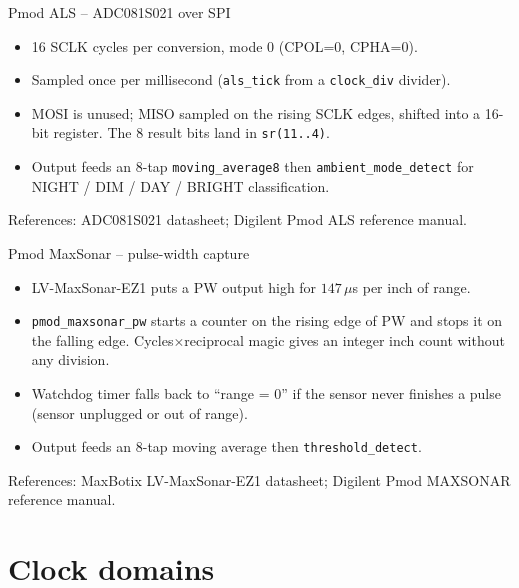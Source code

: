 \documentclass[aspectratio=169,10pt]{beamer}
\begin{document}
\begin{frame}{Pmod ALS -- ADC081S021 over SPI}
    \begin{itemize}
        \item 16 SCLK cycles per conversion, mode 0 (CPOL=0, CPHA=0).
        \item Sampled once per millisecond (\texttt{als\_tick} from a
              \texttt{clock\_div} divider).
        \item MOSI is unused; MISO sampled on the rising SCLK edges,
              shifted into a 16-bit register. The 8 result bits land
              in \texttt{sr(11..4)}.
        \item Output feeds an 8-tap \texttt{moving\_average8} then
              \texttt{ambient\_mode\_detect} for NIGHT / DIM / DAY /
              BRIGHT classification.
    \end{itemize}
    \scriptsize References: ADC081S021 datasheet; Digilent Pmod ALS
    reference manual.
\end{frame}

\begin{frame}{Pmod MaxSonar -- pulse-width capture}
    \begin{itemize}
        \item LV-MaxSonar-EZ1 puts a PW output high for $147\,\mu$s per
              inch of range.
        \item \texttt{pmod\_maxsonar\_pw} starts a counter on the
              rising edge of PW and stops it on the falling edge.
              Cycles$\times$reciprocal magic gives an integer inch
              count without any division.
        \item Watchdog timer falls back to ``range = 0'' if the sensor
              never finishes a pulse (sensor unplugged or out of
              range).
        \item Output feeds an 8-tap moving average then \texttt{threshold\_detect}.
    \end{itemize}
    \scriptsize References: MaxBotix LV-MaxSonar-EZ1 datasheet;
    Digilent Pmod MAXSONAR reference manual.
\end{frame}

\section{Clock domains}
\end{document}
